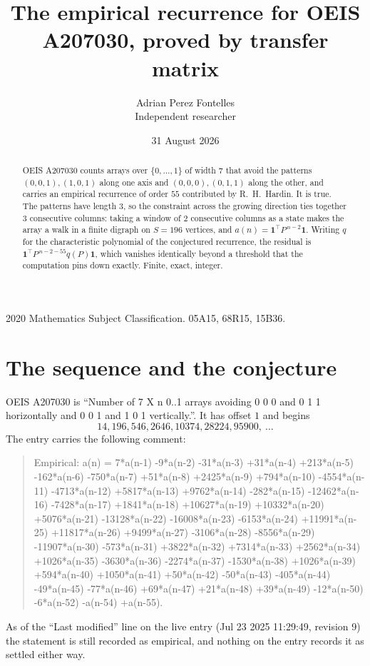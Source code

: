 \documentclass[11pt,a4paper]{article}
\title{The empirical recurrence for OEIS A207030, proved by transfer matrix}
\author{Adrian Perez Fontelles\\ \small Independent researcher}
\date{31 August 2026}
\theoremstyle{plain}
\theoremstyle{definition}
\begin{document}
\maketitle

\begin{abstract}
OEIS A207030 counts arrays over $\{0,\dots,1\}$ of width $7$ that avoid the patterns
$(0,0,1), (1,0,1)$ along one axis and $(0,0,0), (0,1,1)$ along the other, and carries an empirical recurrence of
order $55$ contributed by R.~H.~Hardin. It is true. The patterns have length $3$, so
the constraint across the growing direction ties together $3$ consecutive columns: taking a
window of $2$ consecutive columns as a state makes the array a walk in a finite digraph
on $S=196$ vertices, and $a(n)=\mathbf{1}^{\!\top}P^{\,n-2}\mathbf{1}$. Writing $q$
for the characteristic polynomial of the conjectured recurrence, the residual is
$\mathbf{1}^{\!\top}P^{\,n-2-55}q(P)\mathbf{1}$, which vanishes identically
beyond a threshold that the computation pins down exactly. Finite, exact, integer.
\end{abstract}

\noindent\small 2020 Mathematics Subject Classification. 05A15, 68R15, 15B36.\normalsize

\section{The sequence and the conjecture}

OEIS A207030 is ``Number of 7 X n 0..1 arrays avoiding 0 0 0 and 0 1 1 horizontally and 0 0 1 and 1 0 1 vertically.''. It has offset
$1$ and begins
\[
14, 196, 546, 2646, 10374, 28224, 95900,\ \dots
\]
The entry carries the following comment:
\begin{quote}\small
Empirical: a(n) = 7*a(n-1) -9*a(n-2) -31*a(n-3) +31*a(n-4) +213*a(n-5) -162*a(n-6) -750*a(n-7) +51*a(n-8) +2425*a(n-9) +794*a(n-10) -4554*a(n-11) -4713*a(n-12) +5817*a(n-13) +9762*a(n-14) -282*a(n-15) -12462*a(n-16) -7428*a(n-17) +1841*a(n-18) +10627*a(n-19) +10332*a(n-20) +5076*a(n-21) -13128*a(n-22) -16008*a(n-23) -6153*a(n-24) +11991*a(n-25) +11817*a(n-26) +9499*a(n-27) -3106*a(n-28) -8556*a(n-29) -11907*a(n-30) -573*a(n-31) +3822*a(n-32) +7314*a(n-33) +2562*a(n-34) +1026*a(n-35) -3630*a(n-36) -2274*a(n-37) -1530*a(n-38) +1026*a(n-39) +594*a(n-40) +1050*a(n-41) +50*a(n-42) -50*a(n-43) -405*a(n-44) -49*a(n-45) -77*a(n-46) +69*a(n-47) +21*a(n-48) +39*a(n-49) -12*a(n-50) -6*a(n-52) -a(n-54) +a(n-55).
\end{quote}
As of the ``Last modified'' line on the live entry (Jul 23 2025 11:29:49, revision
9) the statement is still recorded as empirical, and nothing on the entry
records it as settled either way.
\end{document}
